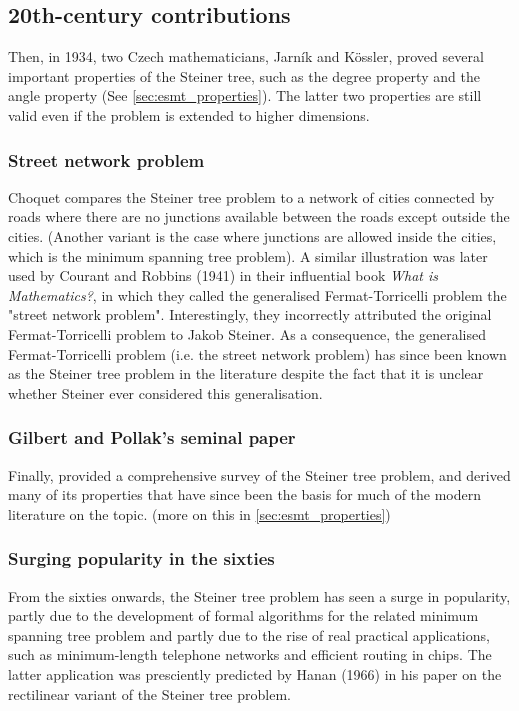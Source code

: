 \documentclass{l4proj}
\begin{document}
\subsection{20th-century contributions}
Then, in 1934, two Czech mathematicians, Jarník and Kössler, proved several important properties of the Steiner tree, such as the degree property and the angle property (See \ref{sec:esmt_properties}). The latter two properties are still valid even if the problem is extended to higher dimensions.

\subsubsection{Street network problem}
Choquet compares the Steiner tree problem to a network of cities connected by roads where there are no junctions available between the roads except outside the cities. (Another variant is the case where junctions are allowed inside the cities, which is the minimum spanning tree problem).
A similar illustration was later used by Courant and Robbins (1941) in their influential book \textit{What is Mathematics?}, in which they called the generalised Fermat-Torricelli problem the "street network problem". Interestingly, they incorrectly attributed the original Fermat-Torricelli problem to Jakob Steiner. As a consequence, the generalised Fermat-Torricelli problem (i.e. the street network problem) has since been known as the Steiner tree problem in the literature despite the fact that it is unclear whether Steiner ever considered this generalisation.

\subsubsection{Gilbert and Pollak's seminal paper}
Finally, \cite{Gilbert1968SteinerMT} provided a comprehensive survey of the Steiner tree problem, and derived many of its properties that have since been the basis for much of the modern literature on the topic. (more on this in \ref{sec:esmt_properties})

\subsubsection{Surging popularity in the sixties}
From the sixties onwards, the Steiner tree problem has seen a surge in popularity, partly due to the development of formal algorithms for the related minimum spanning tree problem and partly due to the rise of real practical applications, such as minimum-length telephone networks and efficient routing in chips. The latter application was presciently predicted by Hanan (1966) in his paper on the rectilinear variant of the Steiner tree problem.
\end{document}
